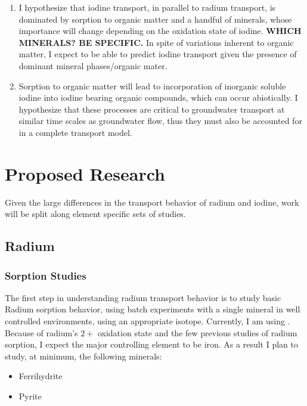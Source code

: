 \documentclass[twoside,12pt,titlepage]{article}
\newcommand{\isotope}[2]{\ch{^{#1}#2}}
\begin{document}
\begin{enumerate}[label = \arabic*)]
	\item I hypothesize that iodine transport, in parallel to radium transport, is dominated by sorption to organic matter and a handful of minerals, whose importance will change depending on the oxidation state of iodine. \textbf{WHICH MINERALS? BE SPECIFIC.} In spite of variations inherent to organic matter, I expect to be able to predict iodine transport given the presence of dominant mineral phases/organic mater. 
	\item Sorption to organic matter will lead to incorporation of inorganic soluble iodine into iodine bearing organic compounds, which can occur abiotically. I hypothesize that these processes are critical to groundwater transport at similar time scales as groundwater flow, thus they must also be accounted for in a complete transport model.
\end{enumerate}



\section{Proposed Research}

Given the large differences in the transport behavior of radium and iodine, work will be split along element specific sets of studies.

\subsection{Radium}

\subsubsection{Sorption Studies}
The first step in understanding radium transport behavior is to study basic Radium sorption behavior, using batch experiments with a single mineral in well controlled environments, using an appropriate isotope. Currently, I am using \isotope{226}{Ra}. Because of radium's $2+$ oxidation state and the few previous studies of radium sorption, I expect the major controlling element to be iron. As a result I plan to study, at minimum, the following minerals:

\begin{itemize}
	\item Ferrihydrite
	\item Pyrite
\end{itemize}
\end{document}
